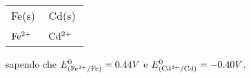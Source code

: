 \begin{center}
    \begin{tabular}{|p{3.7cm}||p{3.7cm}|}
         Fe(s) & Cd(s)\\[0.5ex]
         $\rm Fe^{2+}$ \, \big[0.0120-M\big] & $\rm Cd^{2+}$ \, \big[0.8988-M\big] \\[0.5ex]
    \end{tabular}
\end{center}

sapendo che $E^0_{(\rm Fe^{2+}/Fe)}=0.44V$ e $E^0_{(\rm Cd^{2+}/Cd)}=-0.40V$.


